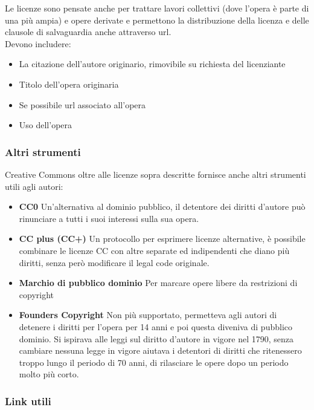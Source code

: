 Le licenze sono pensate anche per trattare lavori collettivi (dove l'opera è parte di una più ampia) e opere derivate e permettono la distribuzione della licenza e delle clausole di salvaguardia anche attraverso url.\\

Devono includere:
\begin{itemize}
\item La citazione dell'autore originario, rimovibile su richiesta del licenziante
\item Titolo dell'opera originaria
\item Se possibile url associato all'opera
\item Uso dell'opera
\end{itemize}

\subsubsection{Altri strumenti}

Creative Commons oltre alle licenze sopra descritte fornisce anche altri strumenti utili agli autori:

\begin{itemize}
\item \textbf{CC0} Un'alternativa al dominio pubblico, il detentore dei diritti d'autore può rinunciare a tutti i suoi interessi sulla sua opera.
\item \textbf{CC plus (CC+)} Un protocollo  per esprimere licenze alternative, è possibile combinare le licenze CC con altre separate ed indipendenti che diano più diritti, senza però modificare il legal code originale.
\item \textbf{Marchio di pubblico dominio} Per marcare opere libere da restrizioni di copyright
\item \textbf{Founders Copyright} Non più supportato, permetteva agli autori di detenere i diritti per l'opera per 14 anni e poi questa diveniva di pubblico dominio. Si ispirava alle leggi sul diritto d'autore in vigore nel 1790, senza cambiare nessuna legge in vigore aiutava i detentori di diritti che ritenessero troppo lungo il periodo di 70 anni, di rilasciare le opere dopo un periodo molto più corto.
\end{itemize}

\subsubsection{Link utili}

